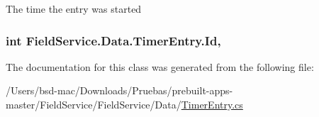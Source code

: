 The time the entry was started 

\hypertarget{class_field_service_1_1_data_1_1_timer_entry_ab9e04cf51877fe4262e32bf902341049}{
\subsubsection[{Id}]{\setlength{\rightskip}{0pt plus 5cm}int Field\+Service.\+Data.\+Timer\+Entry.\+Id\hspace{0.3cm}{\ttfamily [get]}, {\ttfamily [set]}}}\label{class_field_service_1_1_data_1_1_timer_entry_ab9e04cf51877fe4262e32bf902341049}


The documentation for this class was generated from the following file\+:\begin{DoxyCompactItemize}
\item 
/\+Users/bsd-\/mac/\+Downloads/\+Pruebas/prebuilt-\/apps-\/master/\+Field\+Service/\+Field\+Service/\+Data/\hyperlink{_timer_entry_8cs}{Timer\+Entry.\+cs}\end{DoxyCompactItemize}
